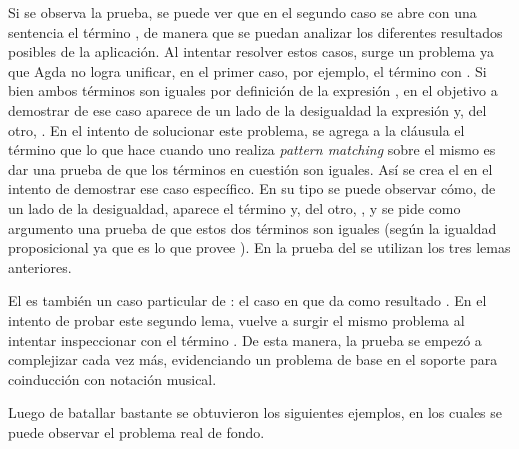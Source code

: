 \begin{AgdaAlign}

Si se observa la prueba, se puede ver que en el segundo caso se abre con una sentencia  el término , de manera que se puedan analizar los diferentes resultados posibles de la aplicación. Al intentar resolver estos casos, surge un problema ya que Agda no logra unificar, en el primer caso, por ejemplo, el término  con  . Si bien ambos términos son iguales por definición de la expresión , en el objetivo a demostrar de ese caso aparece de un lado de la desigualdad la expresión  y, del otro,  . En el intento de solucionar este problema, se agrega a la cláusula  el término   que lo que hace cuando uno realiza \textit{pattern matching} sobre el mismo es dar una prueba de que los términos en cuestión son iguales. Así se crea el  en el intento de demostrar ese caso específico. En su tipo se puede observar cómo, de un lado de la desigualdad, aparece el término  y, del otro,  , y se pide como argumento una prueba de que estos dos términos son iguales (según la igualdad proposicional ya que es lo que provee ). En la prueba del  se utilizan los tres lemas anteriores. 

\end{AgdaAlign}

El  es también un caso particular de : el caso en que  da como resultado  . En el intento de probar este segundo lema, vuelve a surgir el mismo problema al intentar inspeccionar con  el término \AgdaField{$\flat$} . De esta manera, la prueba se empezó a complejizar cada vez más, evidenciando un problema de base en el soporte para coinducción con notación musical. 

Luego de batallar bastante se obtuvieron los siguientes ejemplos, en los cuales se puede observar el problema real de fondo. 


